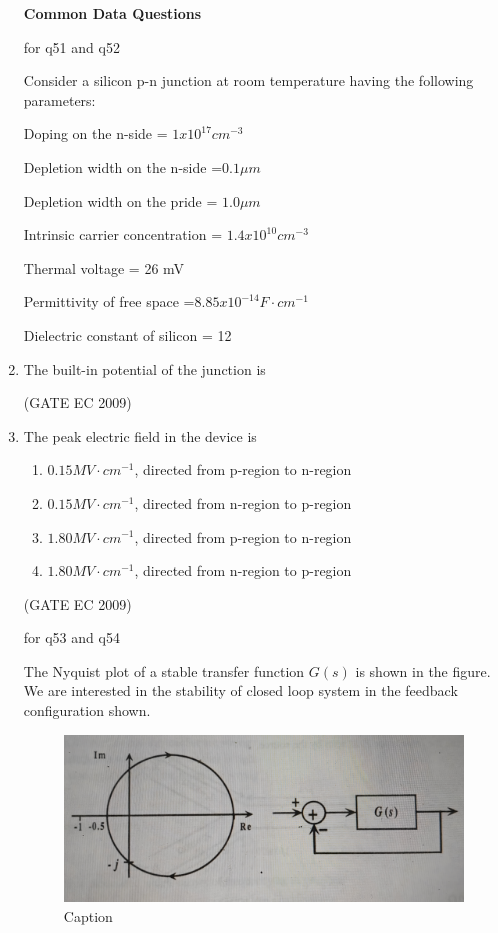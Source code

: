 \documentclass[journal,12pt,onecolumn]{IEEEtran}
\theoremstyle{remark}
\begin{document}
\begin{enumerate}[start=1, label={Q\arabic*.}]
\textbf{Common Data Questions}

for q51 and q52

Consider a silicon p-n junction at room temperature having the following parameters:

Doping on the n-side = $1 x 10^{17} cm^{-3}$

Depletion width on the n-side =$ 0.1 \mu m $

Depletion width on the pride = $1.0 \mu m $

Intrinsic carrier concentration = $1.4 x 10^{10} cm^{-3} $

Thermal voltage = 26 mV 

Permittivity of free space =$8.85 x 10^{-14 }F \cdot cm^{-1} $

Dielectric constant of silicon = 12
\item The built-in potential of the junction is 
\begin{enumerate}[label=(\Alph*)]
\end{enumerate}
\hfill (GATE EC 2009)

\item The peak electric field in the device is
\begin{enumerate}[label=(\Alph*)]
        \item $0.15 MV\cdot cm^{-1}$, directed from p-region to n-region
        \item $0.15 MV\cdot cm^{-1}$, directed from n-region to p-region
        \item $1.80  MV\cdot cm^{-1}$, directed from p-region to n-region
        \item $1.80 MV\cdot cm^{-1}$, directed from n-region to p-region
\end{enumerate}
\hfill (GATE EC 2009)

for q53 and q54

The Nyquist plot of a stable transfer function $G(s)$ is shown in the figure. We are interested in the stability of closed loop system in the feedback configuration shown.
\begin{figure}[H]
    \centering
    \includegraphics[width=0.5\linewidth]{images/img_22.jpg}
    \caption{Caption}
    \label{fig:placeholder}
\end{figure}


\end{enumerate}
\end{document}
